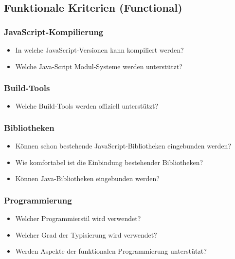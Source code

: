 \subsection{Funktionale Kriterien (Functional)}\label{sec:functionalCriteria}
\subsubsection{JavaScript-Kompilierung}
\begin{itemize}
	\item In welche JavaScript-Versionen kann kompiliert werden?
	\item Welche Java-Script Modul-Systeme werden unterstützt?
\end{itemize}

\subsubsection{Build-Tools}
\begin{itemize}
	\item Welche Build-Tools werden offiziell unterstützt?
\end{itemize}

\subsubsection{Bibliotheken}
\begin{itemize}
	\item Können schon bestehende JavaScript-Bibliotheken eingebunden werden?
	\item Wie komfortabel ist die Einbindung bestehender Bibliotheken?
	\item Können Java-Bibliotheken eingebunden werden?
\end{itemize}

\subsubsection{Programmierung}
\begin{itemize}
	\item Welcher Programmierstil wird verwendet?
	\item Welcher Grad der Typisierung wird verwendet?
	\item Werden Aspekte der funktionalen Programmierung unterstützt?
\end{itemize}

